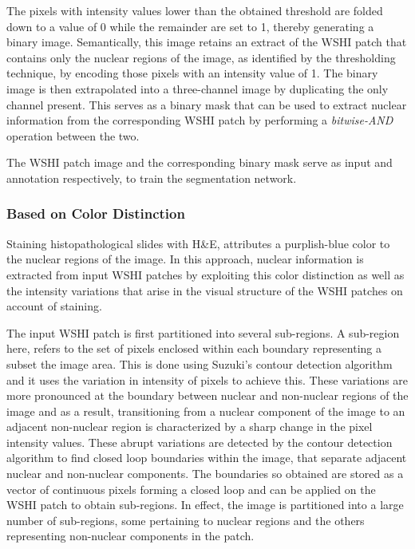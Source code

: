 \documentclass{comjnl}
\begin{document}
The pixels with intensity values lower than the obtained threshold are folded down to a value of 0 while the remainder are set to 1, thereby generating a binary image. Semantically, this image retains an extract of the WSHI patch that contains only the nuclear regions of the image, as identified by the thresholding technique, by encoding those pixels with an intensity value of 1. The binary image is then extrapolated into a three-channel image by duplicating the only channel present. This serves as a binary mask that can be used to extract nuclear information from the corresponding WSHI patch by performing a \emph{bitwise-AND} operation between the two.

The WSHI patch image and the corresponding binary mask serve as input and annotation respectively, to train the segmentation network. 

\subsubsection{Based on Color Distinction}

Staining histopathological slides with H&E, attributes a purplish-blue color to the nuclear regions of the image. In this approach, nuclear information is extracted from input WSHI patches by exploiting this color distinction as well as the intensity variations that arise in the visual structure of the WSHI patches on account of staining.

The input WSHI patch is first partitioned into several sub-regions. A sub-region here, refers to the set of pixels enclosed within each boundary representing a subset the image area. This is done using Suzuki's contour detection algorithm \cite{suzuki} and it uses the variation in intensity of pixels to achieve this. These variations are more pronounced at the boundary between nuclear and non-nuclear regions of the image and as a result, transitioning from a nuclear component of the image to an adjacent non-nuclear region is characterized by a sharp change in the pixel intensity values. These abrupt variations are detected by the contour detection algorithm to find closed loop boundaries within the image, that separate adjacent nuclear and non-nuclear components. The boundaries so obtained are stored as a vector of continuous pixels forming a closed loop and can be applied on the WSHI patch to obtain sub-regions. In effect, the image is partitioned into a large number of sub-regions, some pertaining to nuclear regions and the others representing non-nuclear components in the patch. 
\end{document}
